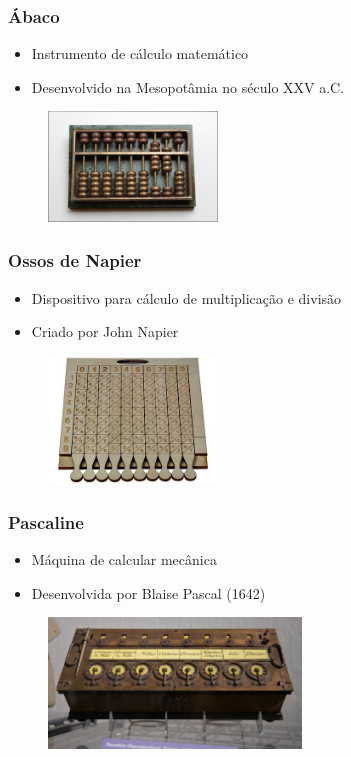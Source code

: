 \documentclass[aspectratio=169,
				xcolor=table]{beamer}
\begin{document}
	\begin{frame}
		\frametitle{Ábaco}
		\begin{itemize}
			\item Instrumento de cálculo matemático 
			\item Desenvolvido na Mesopotâmia no século XXV a.C.
		\end{itemize}
		\begin{figure}
			\centering
			\includegraphics[width=0.4\textwidth, keepaspectratio]{../figs/cap03/abaco} 		
		\end{figure}
	\end{frame}

	\begin{frame}
		\frametitle{Ossos de Napier}
		\begin{itemize}
			\item Dispositivo para cálculo de multiplicação e divisão 
			\item Criado por John Napier 
		\end{itemize}
		\begin{figure}
			\centering
			\includegraphics[width=0.4\textwidth, keepaspectratio]{../figs/cap03/napier} 		
		\end{figure}
	\end{frame}

	\begin{frame}
		\frametitle{Pascaline}
		\begin{itemize}
			\item Máquina de calcular mecânica 
			\item Desenvolvida por Blaise Pascal (1642) 
		\end{itemize}
		\begin{figure}
			\centering
			\includegraphics[width=0.6\textwidth, keepaspectratio]{../figs/cap03/pascaline} 		
		\end{figure}
	\end{frame}
	
\end{document}
